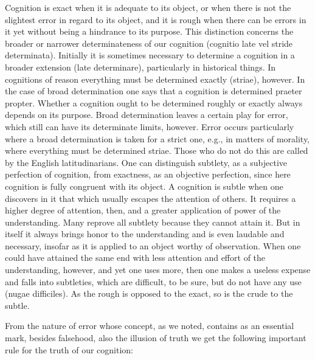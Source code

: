    Cognition is exact when it is adequate to its object, or
    when there is not the slightest error in regard to its object,
    and it is rough when there can be errors in it yet
    without being a hindrance to its purpose.
    This distinction concerns the broader or narrower determinateness
    of our cognition (cognitio late vel stride determinata).
    Initially it is sometimes necessary to determine a cognition
    in a broader extension (late determinare),
    particularly in historical things.
    In cognitions of reason everything must be
    determined exactly (striae), however.
    In the case of broad determination
    one says that a cognition is determined praeter propter.
    Whether a cognition ought to be determined roughly or exactly
    always depends on its purpose.
    Broad determination leaves a certain play for error,
    which still can have its determinate limits, however.
    Error occurs particularly where a broad determination is taken for a strict one,
    e.g., in matters of morality, where everything must be determined striae.
    Those who do not do this are called by the English latitudinarians.
    One can distinguish subtlety, as a subjective perfection of cognition,
    from exactness, as an objective perfection, since here cognition is
    fully congruent with its object.
    A cognition is subtle when one discovers in it that which usually escapes
    the attention of others. It requires a higher degree of attention, then, and
    a greater application of power of the understanding.
    Many reprove all subtlety because they cannot attain it.
    But in itself it always brings honor to the understanding and
    is even laudable and necessary, insofar as it is applied to an object worthy of observation.
    When one could have attained the same end with less attention and
    effort of the understanding, however, and yet one uses more,
    then one makes a useless expense and falls into subtleties,
    which are difficult, to be sure, but do not have any use (nugae difficiles).
    As the rough is opposed to the exact, so is the crude to the subtle.

From the nature of error whose concept, as we noted,
contains as an essential mark, besides falsehood,
also the illusion of truth
we get the following important rule
for the truth of our cognition:


